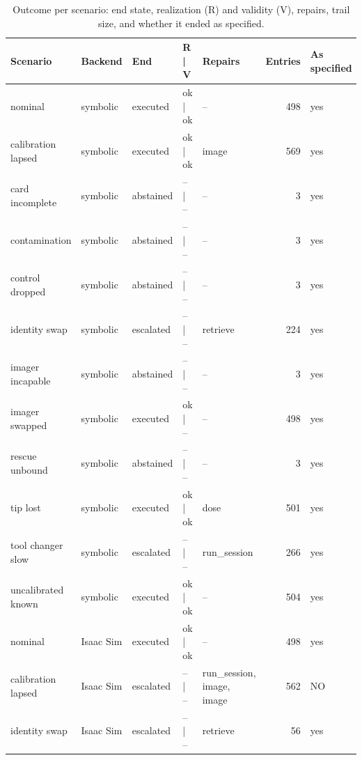 \documentclass[10pt,a4paper]{article}
\begin{document}
\begin{table}[tbp]\centering\footnotesize
\caption{Outcome per scenario: end state, realization (R) and validity (V), repairs, trail size, and whether it ended as specified.}\label{tab:scenarios}
\begin{tabularx}{\linewidth}{lllllrl}\toprule
\textbf{Scenario} & \textbf{Backend} & \textbf{End} & \textbf{R | V} & \textbf{Repairs} & \textbf{Entries} & \textbf{As specified} \\\midrule
nominal & symbolic & executed & ok | ok & – & 498 & yes \\
calibration lapsed & symbolic & executed & ok | ok & image & 569 & yes \\
card incomplete & symbolic & abstained & – | – & – & 3 & yes \\
contamination & symbolic & abstained & – | – & – & 3 & yes \\
control dropped & symbolic & abstained & – | – & – & 3 & yes \\
identity swap & symbolic & escalated & – | – & retrieve & 224 & yes \\
imager incapable & symbolic & abstained & – | – & – & 3 & yes \\
imager swapped & symbolic & executed & ok | – & – & 498 & yes \\
rescue unbound & symbolic & abstained & – | – & – & 3 & yes \\
tip lost & symbolic & executed & ok | ok & dose & 501 & yes \\
tool changer slow & symbolic & escalated & – | – & run\_\allowbreak{}session & 266 & yes \\
uncalibrated known & symbolic & executed & ok | ok & – & 504 & yes \\
nominal & Isaac Sim & executed & ok | ok & – & 498 & yes \\
calibration lapsed & Isaac Sim & escalated & – | – & run\_\allowbreak{}session, image, image & 562 & NO \\
identity swap & Isaac Sim & escalated & – | – & retrieve & 56 & yes \\\bottomrule
\end{tabularx}
\end{table}
\end{document}
